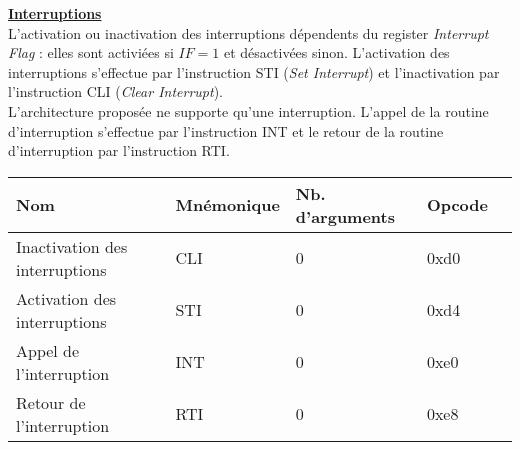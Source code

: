 \documentclass{standalone}
\begin{document}
\begin{minipage}{5in}
\setlength{\parindent}{10pt}
\setlength{\parskip}{3ex plus 0.5ex minus 0.2ex}

\textbf{\underline{Interruptions}}\\

L'activation ou inactivation des interruptions dépendents du register \emph{Interrupt Flag} : elles sont activiées si $IF = 1$ et désactivées sinon. L'activation des interruptions s'effectue par l'instruction STI (\emph{Set Interrupt}) et l'inactivation par l'instruction CLI (\emph{Clear Interrupt}).\\

L'architecture proposée ne supporte qu'une interruption. L'appel de la routine d'interruption s'effectue par l'instruction INT et le retour de la routine d'interruption par l'instruction RTI. 

\renewcommand{\arraystretch}{1.2}
\begin{tabular}{@{}lllll@{}}
\toprule
Nom & Mnémonique & Nb. d'arguments & Opcode \\
\toprule
Inactivation des interruptions & CLI & 0 & 0xd0 \\
Activation des interruptions & STI & 0 & 0xd4\\
Appel de l'interruption & INT & 0 & 0xe0 \\
Retour de l'interruption & RTI & 0 & 0xe8
\end{tabular}

\end{minipage}
\end{document}
